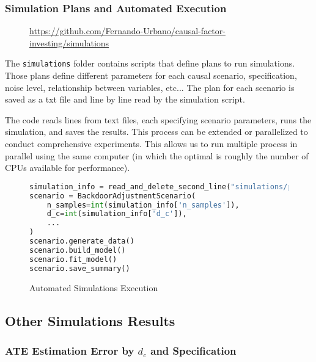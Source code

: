 \documentclass{article}
\numberwithin{equation}{section}
\begin{document}
\subsubsection{Simulation Plans and Automated Execution}

\begin{figure}[H]
    \centering
    \url{https://github.com/Fernando-Urbano/causal-factor-investing/simulations}
\end{figure}

The \texttt{simulations} folder contains scripts that define plans to run simulations. Those plans define different parameters for each causal scenario, specification, noise level, relationship between variables, etc... The plan for each scenario is saved as a txt file and line by line read by the simulation script.

The code reads lines from text files, each specifying scenario parameters, runs the simulation, and saves the results. This process can be extended or parallelized to conduct comprehensive experiments. This allows us to run multiple process in parallel using the same computer (in which the optimal is roughly the number of CPUs available for performance).

\begin{figure}[H]
\begin{lstlisting}[language=python]
simulation_info = read_and_delete_second_line("simulations/plans/backdoor_simulation_plan.txt")
scenario = BackdoorAdjustmentScenario(
    n_samples=int(simulation_info['n_samples']),
    d_c=int(simulation_info['d_c']),
    ...
)
scenario.generate_data()
scenario.build_model()
scenario.fit_model()
scenario.save_summary()
\end{lstlisting}
\caption{Automated Simulations Execution}
\end{figure}

\newpage

\subsection{Other Simulations Results}
\label{subsec:appendix_simulation_results}

\subsubsection{ATE Estimation Error by $d_c$ and Specification}
\end{document}
